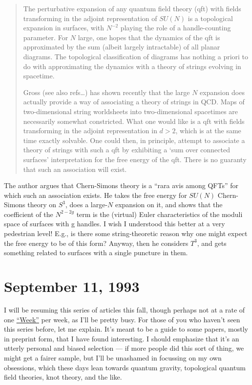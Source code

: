 \documentclass{article}
\begin{document}
\begin{quote}
The perturbative expansion of any quantum field theory (qft) with fields
transforming in the adjoint representation of \(SU(N)\) is a topological
expansion in surfaces, with \(N^{-2}\) playing the role of a
handle-counting parameter. For \(N\) large, one hopes that the dynamics
of the qft is approximated by the sum (albeit largely intractable) of
all planar diagrams. The topological classification of diagrams has
nothing a priori to do with approximating the dynamics with a theory of
strings evolving in spacetime.

Gross (see also refs\ldots) has shown recently that the large \(N\)
expansion does actually provide a way of associating a theory of strings
in QCD. Maps of two-dimensional string worldsheets into two-dimensional
spacetimes are necessarily somewhat constricted. What one would like is
a qft with fields transforming in the adjoint representation in
\(d > 2\), which is at the same time exactly solvable. One could then,
in principle, attempt to associate a theory of strings with such a qft
by exhibiting a `sum over connected surfaces' interpretation for the
free energy of the qft. There is no guaranty that such an association
will exist.
\end{quote}

The author argues that Chern-Simons theory is a ``rara avis among QFTs''
for which such an association exists. He takes the free energy for
\(SU(N)\) Chern-Simons theory on \(S^3\), does a large-\(N\) expansion
on it, and shows that the coefficient of the \(N^{2-2g}\) term is the
(virtual) Euler characteristics of the moduli space of surfaces with g
handles. I wish I understood this better at a very pedestrian level!
E.g., is there some string-theoretic reason why one might expect the
free energy to be of this form? Anyway, then he considers \(T^3\), and
gets something related to surfaces with a single puncture in them.
\hypertarget{week18}{%
\section{September 11, 1993}\label{week18}}

I will be resuming this series of articles this fall, though perhaps not
at a rate of one \protect\hyperlink{week}{``Week''} per week, as I'll be
pretty busy. For those of you who haven't seen this series before, let
me explain. It's meant to be a guide to some papers, mostly in preprint
form, that I have found interesting. I should emphasize that it's an
utterly personal and biased selection --- if more people did this sort
of thing, we might get a fairer sample, but I'll be unashamed in
focussing on my own obsessions, which these days lean towards quantum
gravity, topological quantum field theories, knot theory, and the like.
\end{document}
